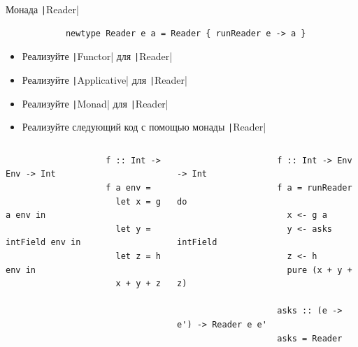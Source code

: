     \begin{frame}[fragile]{Монада \texttt|Reader|}
        \begin{verbatim}
            newtype Reader e a = Reader { runReader e -> a }
        \end{verbatim}
        \begin{itemize}
            \item[\todo] Реализуйте \texttt|Functor| для \texttt|Reader|
            \item[\todo] Реализуйте \texttt|Applicative| для \texttt|Reader|
            \item[\todo] Реализуйте \texttt|Monad| для \texttt|Reader|
            \item[\todo] Реализуйте следующий код с помощью монады \texttt|Reader|
        \end{itemize}
        \vspace{-1em}
        \begin{columns}[onlytextwidth]
            \begin{column}[t]{0.485\textwidth}
                \begin{verbatim}
                    f :: Int -> Env -> Int
                    f a env =
                      let x = g a env in
                      let y = intField env in
                      let z = h env in
                      x + y + z
                \end{verbatim}
            \end{column}\hfill%
            \begin{column}[t]{0.485\textwidth}
                \pause
                \begin{verbatim}
                    f :: Int -> Env -> Int
                    f a = runReader do
                      x <- g a
                      y <- asks intField
                      z <- h
                      pure (x + y + z)

                    asks :: (e -> e') -> Reader e e'
                    asks = Reader
                \end{verbatim}
            \end{column}
        \end{columns}
    \end{frame}

